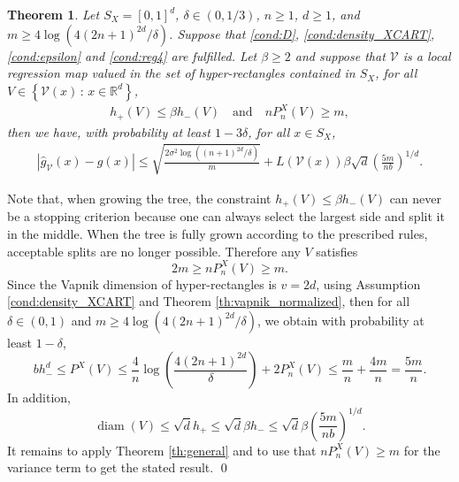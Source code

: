 \documentclass[paper=a4, fontsize=11pt]{scrartcl}
\newcommand{\diam}{\operatorname{diam}}
\newtheorem{theorem}{Theorem}
\begin{document}
\begin{theorem}\label{th_cart_like}
Let $S_X=[0,1]^d$, $\delta \in (0,1/3) $, $n\geq 1$, $d\geq 1$, and $m\geq 4\log(4(2n+1)^{2d}/\delta )$. Suppose that \ref{cond:D}, \ref{cond:density_XCART}, \ref{cond:epsilon} and \ref{cond:reg4} are fulfilled. Let $\beta \geq 2$ and suppose that $\mathcal V$ is a local regression map valued in the set of hyper-rectangles contained in $S_X$, for all $V\in \left\{ \mathcal V(x) \, :\, x\in \mathbb R^d \right\}$,
    \begin{align*}
        h_+(V) \leq \beta h_- (V)
\quad \text{and}\quad 
       n P_n^X( V) \geq  m,
    \end{align*}
    then we have, with probability at least $1-3\delta$, for all $x \in S_X$,
    \begin{align*} 
            |  \hat g_\mathcal V (x) - g(x)  | \leq \sqrt { \frac{2 \sigma ^2 \log((n+1) ^{2d}/\delta) } {  m}} + L(\mathcal{V}(x))  \beta \sqrt{d} \left(\frac{5 m}{ n b}\right)^{1/d}.
    \end{align*}
    
\end{theorem}

    Note that,  when growing the tree, the constraint $h_+(V) \leq \beta h_- (V) $ can never be a stopping criterion because one can always select the largest side and split it in the middle. When the tree is fully grown according to the prescribed rules,  acceptable splits are no longer possible. Therefore any $V $ satisfies 
    $$ 2 m \geq   nP_n^X(V) \geq  m.$$
Since the Vapnik dimension of hyper-rectangles is $ v = 2d$, using Assumption \ref{cond:density_XCART} and Theorem \ref{th:vapnik_normalized}, then for all $\delta \in (0,1)$ and $m\geq 4\log(4(2n+1)^{2d}/\delta )$, we obtain with probability at least $1 - \delta$,
$$b h_-^d \leq P^X(V) \leq \dfrac{4}{n} \log\left(\dfrac{4(2n+1)^{2d}}{\delta} \right) + 2 P_n^X(V) \leq \frac{m}{n} + \frac{4m}{n} = \frac{5m}{n}.$$
 In addition,
$$\diam(V) \leq \sqrt{d} h_+ \leq \sqrt{d} \beta h_- \leq  \sqrt{d} \beta \left(\dfrac{5 m}{n b}\right)^{1/d}.$$
It remains to apply Theorem \ref{th:general} and to use that $n P_n^X(V) \geq m$ for the variance term to get the stated result.
\qed
\end{document}
